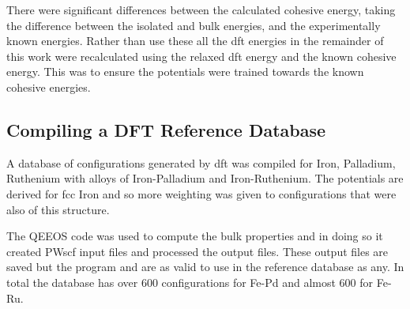 There were significant differences between the calculated cohesive energy, taking the difference between the isolated and bulk energies, and the experimentally known energies.  Rather than use these all the \acrshort{dft} energies in the remainder of this work were recalculated using the relaxed \acrshort{dft} energy and the known cohesive energy.  This was to ensure the potentials were trained towards the known cohesive energies.



\subsection[DFT Reference Database]{Compiling a DFT Reference Database}


A database of configurations generated by \acrshort{dft} was compiled for Iron, Palladium, Ruthenium with alloys of Iron-Palladium and Iron-Ruthenium.  The potentials are derived for \acrshort{fcc} Iron and so more weighting was given to configurations that were also of this structure.

The QEEOS code was used to compute the bulk properties and in doing so it created PWscf input files and processed the output files.  These output files are saved but the program and are as valid to use in the reference database as any.  In total the database has over 600 configurations for Fe-Pd and almost 600 for Fe-Ru.  

